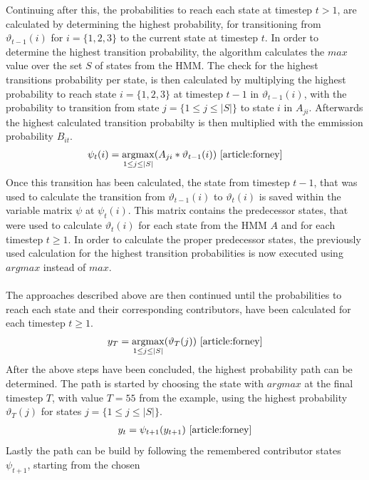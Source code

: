 \documentclass[12pt,journal,compsoc]{IEEEtran}
\newcommand{\argmax}{\operatornamewithlimits{argmax}}
\begin{document}
Continuing after this, the probabilities to reach each state at timestep $t > 1$, are calculated by determining the
highest probability, for transitioning from $\vartheta_{t-1}(i)$ for $i=\{1,2,3\}$ to the current state at timestep $t$.
In order to determine the highest transition probability, the algorithm calculates the $max$ value over the set $S$
of states from the HMM. The check for the highest transitions probability per state, is then calculated by
multiplying the highest probability to reach state $i=\{1,2,3\}$ at timestep $t-1$ in $\vartheta_{t-1}(i)$, with the
probability to transition from state $j=\{1\leq j\leq\mid S\mid\}$ to state $i$ in $A_{ji}$. Afterwards the highest
calculated transition probabilty is then multiplied with the emmission probability $B_{it}$.
\begin{align*}
	\displaystyle \psi_{t}(i)=\argmax_{1\leq j\leq\mid S\mid}(A_{ji}*\vartheta_{t-1}(i)) \text{ \cite{article:forney}}
\end{align*}
Once this transition has been calculated, the state from timestep $t - 1$, that was used to calculate the transition
from $\vartheta_{t-1}(i)$ to $\vartheta_{t}(i)$ is saved within the variable matrix $\psi$ at $\psi_{t}(i)$.
This matrix contains the predecessor states, that were used to calculate $\vartheta_{t}(i)$ for each state
from the HMM $A$ and for each timestep $t \geq 1$. In order to calculate the proper predecessor states, the
previously used calculation for the highest transition probabilities is now executed using $argmax$ instead of $max$.\\
\\
The approaches described above are then continued until the probabilities to reach each state and their corresponding contributors,
have been calculated for each timestep $t \geq 1$.
\begin{align*}
	\displaystyle y_{T}=\argmax_{1\leq j\leq\mid S\mid}(\vartheta_{T}(j)) \text{ \cite{article:forney}}
\end{align*}
After the above steps have been concluded, the highest probability path can be determined. The path is started by
choosing the state with $argmax$ at the final timestep $T$, with value $T=55$ from the example, using the highest probability $\vartheta_{T}(j)$ for states
$j=\{1\leq j\leq\mid S\mid\}$.
\begin{align*}
	\displaystyle y_{t}=\psi_{t+1}(y_{t+1}) \text{ \cite{article:forney}}
\end{align*}
Lastly the path can be build by following the remembered contributor states $\psi_{t+1}$, starting from the chosen
\end{document}
